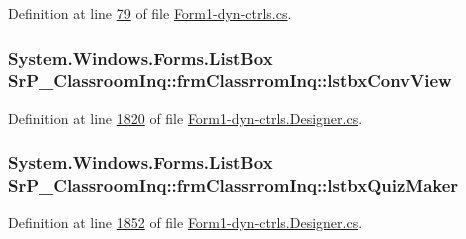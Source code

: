 \-Definition at line \hyperlink{_form1-dyn-ctrls_8cs_source_l00079}{79} of file \hyperlink{_form1-dyn-ctrls_8cs_source}{\-Form1-\/dyn-\/ctrls.\-cs}.

\hypertarget{class_sr_p___classroom_inq_1_1frm_classrrom_inq_aa78736e6fefabc449eb2ac37ce4f5f60}{
\subsubsection[{lstbx\-Conv\-View}]{\setlength{\rightskip}{0pt plus 5cm}\-System.\-Windows.\-Forms.\-List\-Box {\bf \-Sr\-P\-\_\-\-Classroom\-Inq\-::frm\-Classrrom\-Inq\-::lstbx\-Conv\-View}}}
\label{class_sr_p___classroom_inq_1_1frm_classrrom_inq_aa78736e6fefabc449eb2ac37ce4f5f60}


\-Definition at line \hyperlink{_form1-dyn-ctrls_8_designer_8cs_source_l01820}{1820} of file \hyperlink{_form1-dyn-ctrls_8_designer_8cs_source}{\-Form1-\/dyn-\/ctrls.\-Designer.\-cs}.

\hypertarget{class_sr_p___classroom_inq_1_1frm_classrrom_inq_af2496f0a0579263d9def95bd23d29c89}{
\subsubsection[{lstbx\-Quiz\-Maker}]{\setlength{\rightskip}{0pt plus 5cm}\-System.\-Windows.\-Forms.\-List\-Box {\bf \-Sr\-P\-\_\-\-Classroom\-Inq\-::frm\-Classrrom\-Inq\-::lstbx\-Quiz\-Maker}}}
\label{class_sr_p___classroom_inq_1_1frm_classrrom_inq_af2496f0a0579263d9def95bd23d29c89}


\-Definition at line \hyperlink{_form1-dyn-ctrls_8_designer_8cs_source_l01852}{1852} of file \hyperlink{_form1-dyn-ctrls_8_designer_8cs_source}{\-Form1-\/dyn-\/ctrls.\-Designer.\-cs}.

